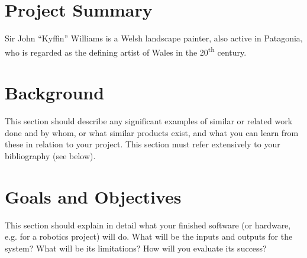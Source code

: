 \documentclass[11pt,fleqn,twoside]{article}
\begin{document}

\mmp

\setcounter{tocdepth}{3} %
\tableofcontents

\newpage

\section{Project Summary}
Sir John ``Kyffin'' Williams is a Welsh landscape painter, also active in Patagonia, who is regarded as the defining artist of Wales in the 20\textsuperscript{th} century.

\section{Background}
This section should describe any significant examples of similar or related work done and by whom, or what similar products exist, and what you can learn from these in relation to your project. This section must refer extensively to your bibliography (see below).

\section{Goals and Objectives}
This section should explain in detail what your finished software (or hardware, e.g. for a robotics project) will do. What will be the inputs and outputs for the system? What will be its limitations? How will you evaluate its success?  
\end{document}

